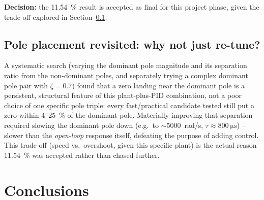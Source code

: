 \documentclass[11pt,letterpaper]{article}
\begin{document}
\textbf{Decision:} the \SI{11.54}{\percent} result is accepted as final for this project phase, given
the trade-off explored in Section~\ref{sec:pz-explore}.

\subsection{Pole placement revisited: why not just re-tune?}
\label{sec:pz-explore}

A systematic search (varying the dominant pole magnitude and its separation ratio from the non-dominant
poles, and separately trying a complex dominant pole pair with $\zeta=0.7$) found that a zero landing
near the dominant pole is a persistent, structural feature of this plant-plus-PID combination, not a
poor choice of one specific pole triple: every fast/practical candidate tested still put a zero within
\SI{4}{}--\SI{25}{\percent} of the dominant pole. Materially improving that separation required slowing
the dominant pole down (e.g.\ to $\sim$\SI{5000}{rad/s}, $\tau\approx\SI{800}{\micro\second}$) -- slower
than the \emph{open-loop} response itself, defeating the purpose of adding control. This trade-off
(speed vs.\ overshoot, given this specific plant) is the actual reason \SI{11.54}{\percent} was accepted
rather than chased further.

\section{Conclusions}
\end{document}
